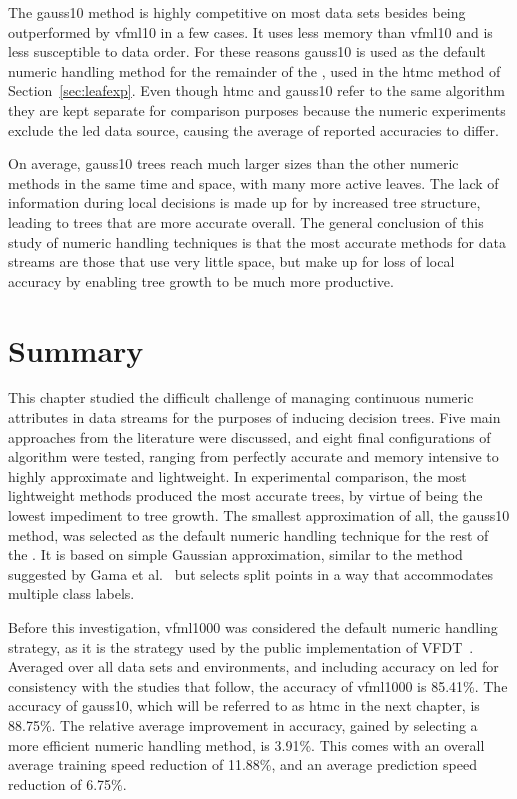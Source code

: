 The {\sc gauss10} method is highly competitive on most data sets besides being outperformed by {\sc vfml10} in a few cases. It uses less memory than {\sc vfml10} and is less susceptible to data order.
For these reasons {\sc gauss10} is used as the default numeric handling method for the remainder of the \thesisc, used in the {\sc htmc} method of Section~\ref{sec:leafexp}. Even though {\sc htmc} and {\sc gauss10} refer to the same algorithm they are kept separate for comparison purposes because the numeric experiments exclude the {\sc led} data source, causing the average of reported accuracies to differ.

On average, {\sc gauss10} trees reach much larger sizes than the other numeric methods in the same time and space, with many more active leaves. The lack of information during local decisions is made up for by increased tree structure, leading to trees that are more accurate overall. The general conclusion of this study of numeric handling techniques is that the most accurate methods for data streams  are those that use very little space, but make up for loss of local accuracy by enabling tree growth to be much more productive. 

\section{Summary}

This chapter studied the difficult challenge of managing continuous numeric attributes in data streams for the purposes of inducing decision trees. Five main approaches from the literature were discussed, and eight final configurations of algorithm were tested, ranging from perfectly accurate and memory intensive to highly approximate and lightweight. In experimental comparison, the most lightweight methods produced the most accurate trees, by virtue of being the lowest impediment to tree growth. The smallest approximation of all, the {\sc gauss10} method, was selected as the default numeric handling technique for the rest of the \thesisc. It is based on simple Gaussian approximation, similar to the method suggested by Gama et al.~\cite{ufft} but selects split points in a way that accommodates multiple class labels.

Before this investigation, {\sc vfml1000} was considered the default
numeric handling strategy, as it is the strategy used by the public
implementation of VFDT~\cite{vfml}. Averaged over all data sets and
environments, and including accuracy on {\sc led} for consistency with the
studies that follow, the accuracy of {\sc vfml1000} is 85.41\%. The accuracy
of {\sc gauss10}, which will be referred to as {\sc htmc} in
the next chapter, is 88.75\%. The relative average improvement in accuracy,
gained by selecting a more efficient numeric handling method, is 3.91\%. This comes with an overall average training speed reduction of 11.88\%, and an average prediction speed reduction of 6.75\%.

